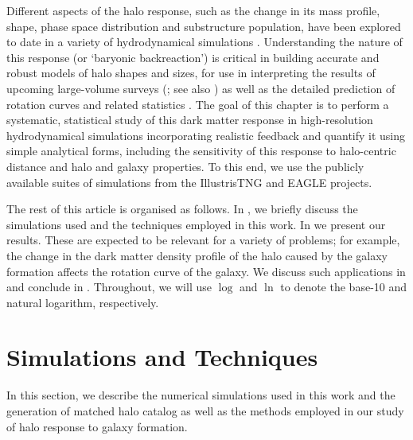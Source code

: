 Different aspects of the halo response, such as the change in its mass profile, shape, phase space distribution and substructure population, have been explored to date in a variety of hydrodynamical simulations \citep[see, e.g.,][]{2004ApJ...611L..73K,2008ApJ...681.1076D,2014MNRAS.441.2986D,2015MNRAS.451.1247S,2017MNRAS.466.3876Z,2017MNRAS.472.4343C,2019MNRAS.484..476C,2021arXiv210900012C,2021MNRAS.501.5679C,2020MNRAS.494.4291C,freundlich+20,riggs+22}.
Understanding the nature of this response (or `baryonic backreaction') is critical in building accurate and robust models of halo shapes and sizes, for use in interpreting the results of upcoming large-volume surveys (\citealp{2015JCAP...12..049S,2018MNRAS.480.3962C,2021MNRAS.503.3596A}; see also \citealp{velliscig+14,hwvh15,mead+15}) as well as the detailed prediction of rotation curves and related statistics \citep{2021MNRAS.507..632P,2021arXiv211200026P}.
The goal of this chapter is to perform a systematic, statistical study of this dark matter response in high-resolution hydrodynamical simulations incorporating realistic feedback and quantify it using simple analytical forms, including the sensitivity of this response to halo-centric distance and halo and galaxy properties. To this end, we use the publicly available suites of simulations from the IllustrisTNG and EAGLE projects. 


The rest of this article is organised as follows.
In , we briefly discuss the simulations used and the techniques employed in this work. In  we present our results. These are expected to be relevant for a variety of problems; for example, the change in the dark matter density profile of the halo caused by the galaxy formation affects the rotation curve of the galaxy.
We discuss such applications in  and conclude in . 
Throughout, we will use $\log$ and $\ln$ to denote the base-10 and natural logarithm, respectively.











\section{Simulations and Techniques}
\label{sec:sim-and-teq-ch:z0main}
In this section, we describe the numerical simulations used in this work and the generation of matched halo catalog as well as the methods employed in our study of halo response to galaxy formation.

